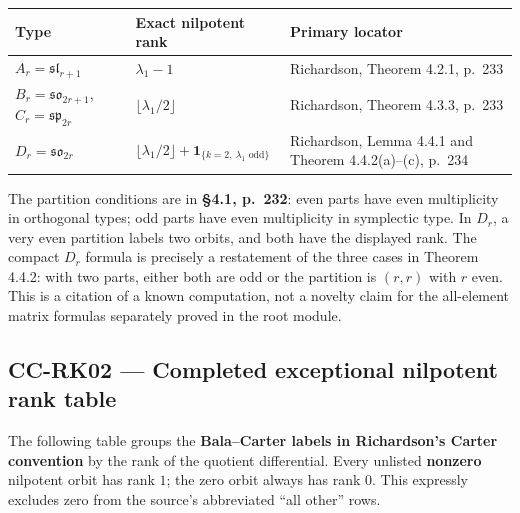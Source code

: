 \documentclass[11pt,a4paper]{article}
\theoremstyle{definition}\newtheorem{definition}[theorem]{Definition}
\theoremstyle{remark}\newtheorem{remark}[theorem]{Remark}
\begin{document}
\begin{longtable}{@{}p{.23\linewidth}p{.38\linewidth}p{.29\linewidth}@{}}
\toprule\noalign{}
\begin{minipage}[b]{\linewidth}\raggedright
Type
\end{minipage} & \begin{minipage}[b]{\linewidth}\raggedleft
Exact nilpotent rank
\end{minipage} & \begin{minipage}[b]{\linewidth}\raggedright
Primary locator
\end{minipage} \\
\midrule\noalign{}
\endhead
\bottomrule\noalign{}
\endlastfoot
\(A_r=\mathfrak{sl}_{r+1}\) & \(\lambda_1-1\) & Richardson, Theorem 4.2.1, p.~233 \\
\(B_r=\mathfrak{so}_{2r+1}\), \(C_r=\mathfrak{sp}_{2r}\) & \(\lfloor\lambda_1/2\rfloor\) & Richardson, Theorem 4.3.3, p.~233 \\
\(D_r=\mathfrak{so}_{2r}\) & \(\lfloor\lambda_1/2\rfloor+\mathbf1_{\{k=2,\ \lambda_1\text{ odd}\}}\) & Richardson, Lemma 4.4.1 and Theorem 4.4.2(a)--(c), p.~234 \\
\end{longtable}

The partition conditions are in \textbf{§4.1, p.~232}: even parts have even multiplicity in orthogonal types; odd parts have even multiplicity in symplectic type. In \(D_r\), a very even partition labels two orbits, and both have the displayed rank. The compact \(D_r\) formula is precisely a restatement of the three cases in Theorem 4.4.2: with two parts, either both are odd or the partition is \((r,r)\) with \(r\) even. This is a citation of a known computation, not a novelty claim for the all-element matrix formulas separately proved in the root module.

\subsection{CC-RK02 --- Completed exceptional nilpotent rank table}\label{cc-rk02-completed-exceptional-nilpotent-rank-table}

The following table groups the \textbf{Bala--Carter labels in Richardson's Carter convention} by the rank of the quotient differential. Every unlisted \textbf{nonzero} nilpotent orbit has rank \(1\); the zero orbit always has rank \(0\). This expressly excludes zero from the source's abbreviated ``all other'' rows.
\end{document}
